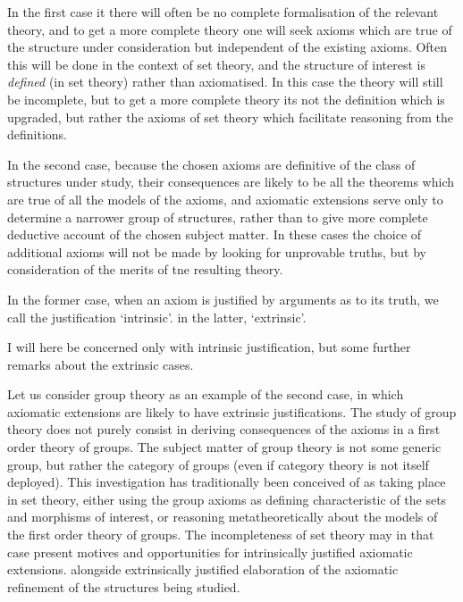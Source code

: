 \documentclass[10pt,titlepage]{article}
\begin{document}
In the first case it there will often be no complete formalisation of the relevant theory, and to get a more complete theory one will seek axioms which are true of the structure under consideration but independent of the existing axioms.
Often this will be done in the context of set theory, and the structure of interest is \emph{defined} (in set theory) rather than axiomatised.
In this case the theory will still be incomplete, but to get a more complete theory its not the definition which is upgraded, but rather the axioms of set theory which facilitate reasoning from the definitions.

In the second case, because the chosen axioms are definitive of the class of structures under study, their consequences are likely to be all the theorems which are true of all the models of the axioms, and axiomatic extensions serve only to determine a narrower group of structures, rather than to give more complete deductive account of the chosen subject matter.
In these cases the choice of additional axioms will not be made by looking for unprovable truths, but by consideration of the merits of tne resulting theory.

In the former case, when an axiom is justified by arguments as to its truth, we call the justification `intrinsic'. in the latter, `extrinsic'.

I will here be concerned only with intrinsic justification, but some further remarks about the extrinsic cases.

Let us consider group theory as an example of the second case, in which axiomatic extensions are likely to have extrinsic justifications.
The study of group theory does not purely consist in deriving consequences of the axioms in a first order theory of groups.
The subject matter of group theory is not some generic group, but rather the category of groups (even if category theory is not itself deployed).
This investigation has traditionally been conceived of as taking place in set theory, either using the group axioms as defining characteristic of the sets and morphisms of interest, or reasoning metatheoretically about the models of the first order theory of groups.
The incompleteness of set theory may in that case present motives and opportunities for intrinsically justified axiomatic extensions. alongside extrinsically justified elaboration of the axiomatic refinement of the structures being studied. 







%
%






\end{document}
